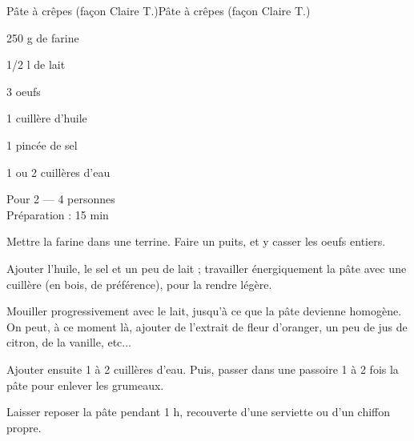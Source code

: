 \begin{recette}{Pâte à crêpes (façon Claire T.)}{Pâte à crêpes (façon Claire T.)}

\begin{ingredients}
250 g de farine\par
1/2 l de lait\par
3 oeufs\par
1 cuillère d'huile\par
1 pincée de sel\par
1 ou 2 cuillères d'eau\par
\end{ingredients}

\begin{infos}
Pour 2 --- 4 personnes\\
Préparation : 15 min\\
\end{infos}

\begin{etapes}
\item Mettre la farine dans une terrine. Faire un puits, et y casser les oeufs entiers.
\item Ajouter l'huile, le sel et un peu de lait ; travailler énergiquement la pâte avec une cuillère (en bois, de préférence), pour la rendre légère.
\item Mouiller progressivement avec le lait, jusqu'à ce que la pâte devienne homogène. On peut, à ce moment là, ajouter de l'extrait de fleur d'oranger, un peu de jus de citron, de la vanille, etc...
\item Ajouter ensuite 1 à 2 cuillères d'eau. Puis, passer dans une passoire 1 à 2 fois la pâte pour enlever les grumeaux.
\item Laisser reposer la pâte pendant 1 h, recouverte d'une serviette ou d'un chiffon propre.
\end{etapes}

\end{recette}